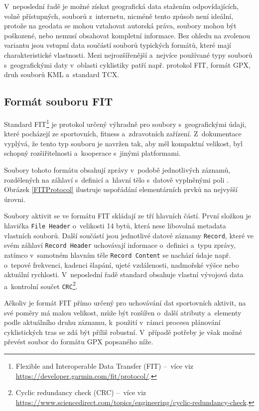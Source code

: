 V~neposlední řadě je možné získat geografická data stažením odpovídajících, volně přístupných, souborů z~internetu, nicméně tento způsob není ideální, protože na geodata se mohou vztahovat autorská práva, soubory mohou být poškozené, nebo nemusí obsahovat kompletní informace.
Bez ohledu na zvolenou variantu jsou vstupní data součástí souborů typických formátů, které mají charakteristické vlastnosti.
Mezi nejrozšířenější a~nejvíce používané typy souborů s~geografickými daty v~oblasti cyklistiky patří např. protokol FIT, formát GPX, druh souborů KML a~standard TCX.

\subsection{Formát souboru FIT}
\label{the-fit-file-format}

Standard FIT\footnote{Flexible and Interoperable Data Transfer (FIT) --~více viz \url{https://developer.garmin.com/fit/protocol/}.} je protokol určený výhradně pro soubory s~geografickými údaji, které pocházejí ze sportovních, fitness a~zdravotních zařízení.
Z~dokumentace \cite{Garmin2024} vyplývá, že tento typ souboru je navržen tak, aby měl kompaktní velikost, byl schopný rozšiřitelnosti a~kooperace s~jinými platformami.

Soubory tohoto formátu obsahují zprávy v~podobě jednotlivých záznamů, rozdělených na záhlaví s~definicí a~hlavní tělo s~datově vyplněnými poli \cite{Garmin2024}.
Obrázek \ref{FITProtocol} ilustruje uspořádání elementárních prvků na nejvyšší úrovni.

Soubory aktivit se ve formátu FIT skládají ze tří hlavních částí.
První složkou je hlavička \texttt{File Header} o~velikosti 14 bytů, která nese libovolná metadata vlastních souborů.
Další součástí jsou jednotlivé datové záznamy \texttt{Record}, které ve svém záhlaví \texttt{Record Header} uchovávají informace o~definici a~typu zprávy, zatímco v~samotném hlavním těle \texttt{Record Content} se nachází údaje např. o~tepové frekvenci, kadenci šlapání, ujeté vzdálenosti, nadmořské výšce nebo aktuální rychlosti.
V~neposlední řadě standard obsahuje vlastní vývojová data a~kontrolní součet \texttt{CRC}\footnote{Cyclic redundancy check (CRC) --~více viz \url{https://www.sciencedirect.com/topics/engineering/cyclic-redundancy-check}.}.

Ačkoliv je formát FIT přímo určený pro uchovávání dat sportovních aktivit, na své poměry má malou velikost, může být rozšířen o~další atributy a~elementy podle aktuálního druhu záznamu, k~použití v~rámci procesu plánování cyklistických tras se zdá být příliš robustní.
V~případě potřeby je však možné převést soubor do formátu GPX popsaného níže.

